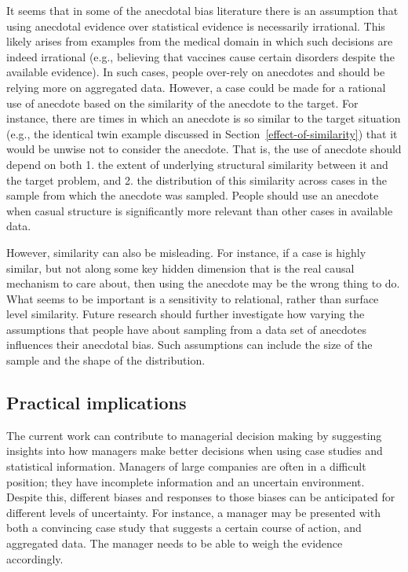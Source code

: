 \documentclass[a4paper, nobind, dvipsnames]{templates/ociamthesis}
\theoremstyle{definition}
\theoremstyle{definition}
\theoremstyle{definition}
\theoremstyle{definition}
\theoremstyle{remark}
\begin{document}
It seems that in some of the anecdotal bias literature there is an assumption
that using anecdotal evidence over statistical evidence is necessarily
irrational. This likely arises from examples from the medical domain in which
such decisions are indeed irrational (e.g., believing that vaccines cause
certain disorders despite the available evidence). In such cases, people
over-rely on anecdotes and should be relying more on aggregated data. However, a
case could be made for a rational use of anecdote based on the similarity of the
anecdote to the target. For instance, there are times in which an anecdote is so
similar to the target situation (e.g., the identical twin example discussed in
Section~\ref{effect-of-similarity}) that it would be unwise not to consider the
anecdote. That is, the use of anecdote should depend on both 1. the extent of
underlying structural similarity between it and the target problem, and 2. the
distribution of this similarity across cases in the sample from which the
anecdote was sampled. People should use an anecdote when casual structure is
significantly more relevant than other cases in available data.

However, similarity can also be misleading. For instance, if a case is highly
similar, but not along some key hidden dimension that is the real causal
mechanism to care about, then using the anecdote may be the wrong thing to do.
What seems to be important is a sensitivity to relational, rather than surface
level similarity. Future research should further investigate how varying the
assumptions that people have about sampling from a data set of anecdotes
influences their anecdotal bias. Such assumptions can include the size of the
sample and the shape of the distribution.

\subsection{Practical implications}

The current work can contribute to managerial decision making by suggesting
insights into how managers make better decisions when using case studies and
statistical information. Managers of large companies are often in a difficult
position; they have incomplete information and an uncertain environment. Despite
this, different biases and responses to those biases can be anticipated for
different levels of uncertainty. For instance, a manager may be presented with
both a convincing case study that suggests a certain course of action, and
aggregated data. The manager needs to be able to weigh the evidence accordingly.
\end{document}
